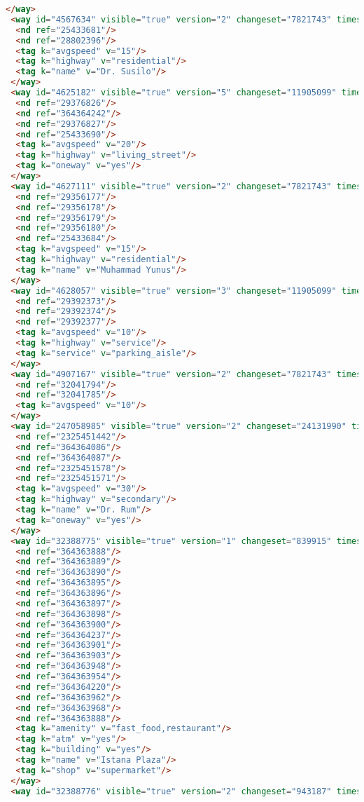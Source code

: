 \begin{lstlisting}[language=HTML,basicstyle=\tiny,caption=test.xml]
 </way>
 <way id="4567634" visible="true" version="2" changeset="7821743" timestamp="2011-04-10T11:15:30Z" user="evo2mind" uid="234610">
  <nd ref="25433681"/>
  <nd ref="28802396"/>
  <tag k="avgspeed" v="15"/>
  <tag k="highway" v="residential"/>
  <tag k="name" v="Dr. Susilo"/>
 </way>
 <way id="4625182" visible="true" version="5" changeset="11905099" timestamp="2012-06-15T14:05:57Z" user="andryono" uid="643030">
  <nd ref="29376826"/>
  <nd ref="364364242"/>
  <nd ref="29376827"/>
  <nd ref="25433690"/>
  <tag k="avgspeed" v="20"/>
  <tag k="highway" v="living_street"/>
  <tag k="oneway" v="yes"/>
 </way>
 <way id="4627111" visible="true" version="2" changeset="7821743" timestamp="2011-04-10T11:15:36Z" user="evo2mind" uid="234610">
  <nd ref="29356177"/>
  <nd ref="29356178"/>
  <nd ref="29356179"/>
  <nd ref="29356180"/>
  <nd ref="25433684"/>
  <tag k="avgspeed" v="15"/>
  <tag k="highway" v="residential"/>
  <tag k="name" v="Muhammad Yunus"/>
 </way>
 <way id="4628057" visible="true" version="3" changeset="11905099" timestamp="2012-06-15T14:05:58Z" user="andryono" uid="643030">
  <nd ref="29392373"/>
  <nd ref="29392374"/>
  <nd ref="29392377"/>
  <tag k="avgspeed" v="10"/>
  <tag k="highway" v="service"/>
  <tag k="service" v="parking_aisle"/>
 </way>
 <way id="4907167" visible="true" version="2" changeset="7821743" timestamp="2011-04-10T11:12:42Z" user="evo2mind" uid="234610">
  <nd ref="32041794"/>
  <nd ref="32041785"/>
  <tag k="avgspeed" v="10"/>
 </way>
 <way id="247058985" visible="true" version="2" changeset="24131990" timestamp="2014-07-14T03:03:33Z" user="brambanan" uid="2092576">
  <nd ref="2325451442"/>
  <nd ref="364364086"/>
  <nd ref="364364087"/>
  <nd ref="2325451578"/>
  <nd ref="2325451571"/>
  <tag k="avgspeed" v="30"/>
  <tag k="highway" v="secondary"/>
  <tag k="name" v="Dr. Rum"/>
  <tag k="oneway" v="yes"/>
 </way>
 <way id="32388775" visible="true" version="1" changeset="839915" timestamp="2009-03-21T14:15:09Z" user="adhitya" uid="7748">
  <nd ref="364363888"/>
  <nd ref="364363889"/>
  <nd ref="364363890"/>
  <nd ref="364363895"/>
  <nd ref="364363896"/>
  <nd ref="364363897"/>
  <nd ref="364363898"/>
  <nd ref="364363900"/>
  <nd ref="364364237"/>
  <nd ref="364363901"/>
  <nd ref="364363903"/>
  <nd ref="364363948"/>
  <nd ref="364363954"/>
  <nd ref="364364220"/>
  <nd ref="364363962"/>
  <nd ref="364363968"/>
  <nd ref="364363888"/>
  <tag k="amenity" v="fast_food,restaurant"/>
  <tag k="atm" v="yes"/>
  <tag k="building" v="yes"/>
  <tag k="name" v="Istana Plaza"/>
  <tag k="shop" v="supermarket"/>
 </way>
 <way id="32388776" visible="true" version="2" changeset="943187" timestamp="2009-04-25T10:24:30Z" user="Andre68" uid="31231">

\end{lstlisting}
